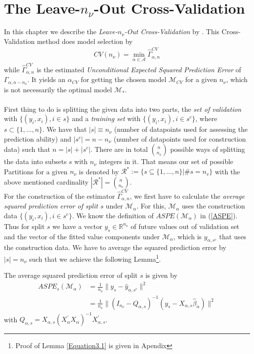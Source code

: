 \documentclass[Research_Module_ES.tex]{subfiles}
\begin{document}
\section{The Leave-$n_\nu$-Out Cross-Validation}
In this chapter we describe the \textit{Leave-$n_\nu$-Out Cross-Validation} by \cite{shao}. This Cross-Validation method does model selection by
\begin{align*}
CV(n_\nu)=\min_{\alpha\in\mathcal{A}}\hat{\Gamma}_{\alpha,n}^{CV}
\end{align*}
while $\hat{\Gamma}_{\alpha,n}^{CV}$ is the estimated \textit{Unconditional Expected Squared Prediction Error} of $\Gamma_{\alpha,n-n_\nu}$. It yields an $\alpha_{CV}$ for getting the chosen model $\mathcal{M}_{CV}$ for a given $n_\nu$, which is not necessarily the optimal model $\mathcal{M}_\ast$.\\\\
First thing to do is splitting the given data into two parts, the \textit{set of validation} with $\{(y_i,x_i), i\in s\}$ and a \textit{training set} with $\{(y_i,x_i), i\in s^c\}$, where $s\subset\{1,...,n\}$. We have that $|s|\equiv n_\nu$ (number of datapoints used for assessing the prediction ability) and $|s^c|=n-n_\nu$ (number of datapoints used for
construction data) such that $n=|s|+|s^c|$. There are in total
$\binom{n}{n_\nu}$ possible ways of splitting the data into subsets $s$ with $n_\nu$ integers in it. That means our set of possible Partitions for a given $n_\nu$ is denoted by $\mathcal{R}^\ast:= \{s\subseteq\{1,\dots,n\}|\# s=n_v\}$ with the above mentioned cardinality $|\mathcal{R}^\ast|=\binom{n}{n_\nu}$.\\

For the construction of the estimator $\hat{\Gamma}_{\alpha,n}^{CV}$, we first have to calculate the \textit{average squared prediction error of split $s$} under $\mathcal{M}_\alpha$. For this,   $\mathcal{M}_\alpha$ uses the construction data $\{(y_i,x_i), i\in s^c\}$. We know the definition of $ASPE(\mathcal{M}_\alpha)$ in (\ref{ASPE}). Thus for split $s$ we have a vector $y_s\in\mathbb{R}^{n_\nu}$ of future values out of validation set and the vector of the fitted value components under $\mathcal{M}_\alpha$, which is $\hat{y}_{\alpha,s^c}$ that uses the construction data. We have to average the squared prediction error by $|s|=n_\nu$ such that we achieve the following Lemma\footnote{Proof of Lemma \ref{Equation3.1} is given in Apendix }.
\begin{lemma}
	\label{Equation3.1}
	The average squared prediction error of split $s$ is given by
	\begin{align*}
		ASPE_{s}(\mathcal{M}_\alpha)&=\frac{1}{n_\nu}\parallel y_s-\hat{y}_{\alpha,s^c}\parallel^2\\
		&=\frac{1}{n_\nu}\parallel (I_{n_\nu}-Q_{\alpha,s})^{-1}(y_s-X_{\alpha,s}\hat{\beta}_\alpha)\parallel^2
	\end{align*}
	with $Q_{\alpha,s}=X_{\alpha,s}(X_\alpha^\prime X_\alpha)^{-1}X_{\alpha,s}^\prime$.
\end{lemma}
\end{document}
